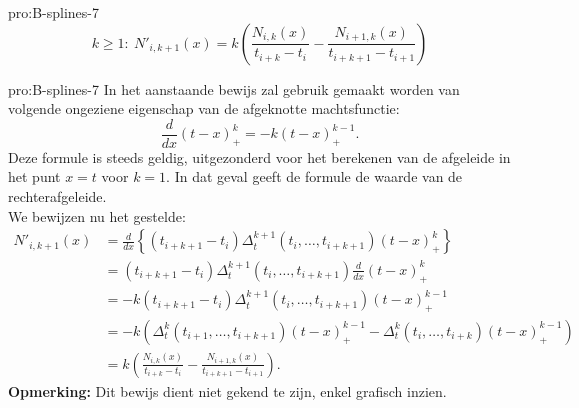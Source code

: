 \begin{pro}[B-spline]{pro:B-splines-7}
    \begin{equation*}
        k \geq 1:\ N'_{i,k+1}(x) = k\left(
            \frac{N_{i,k}(x)}{t_{i+k}-t_i} 
                - \frac{N_{i+1,k}(x)}{t_{i+k+1}-t_{i+1}}
        \right)
    \end{equation*}
    \vspace{-0.2cm}
\end{pro}

\begin{prf}[B-spline]{pro:B-splines-7}
    In het aanstaande bewijs zal gebruik gemaakt worden van volgende ongeziene eigenschap van de afgeknotte machtsfunctie:
        \begin{equation*}
            \frac{d}{dx} (t-x)^k_+ = -k(t-x)^{k-1}_+.
        \end{equation*}
    Deze formule is steeds geldig, uitgezonderd voor het berekenen van de afgeleide in het punt $x=t$ voor $k=1$. In dat geval geeft de formule de waarde van de rechterafgeleide. \\

    We bewijzen nu het gestelde:
    \begin{align*}
        N'_{i,k+1}(x) 
            &= \frac{d}{dx}\left\{
                    (t_{i+k+1}-t_i) \Delta_t^{k+1}(t_i,\ldots,t_{i+k+1}) (t-x)^k_+
                \right\} \\
            &= (t_{i+k+1}-t_i) \Delta_t^{k+1}(t_i,\ldots,t_{i+k+1}) \frac{d}{dx} (t-x)^k_+ \\
            &= -k(t_{i+k+1}-t_i) \Delta_t^{k+1}(t_i,\ldots,t_{i+k+1}) (t-x)^{k-1}_+ \\
            &= -k\left(
                \Delta_t^k(t_{i+1},\ldots,t_{i+k+1})(t-x)_+^{k-1}
                - \Delta_t^k(t_i,\ldots,t_{i+k})(t-x)_+^{k-1}
            \right) \\
            &= k\left(
                \frac{N_{i,k}(x)}{t_{i+k}-t_i} 
                - \frac{N_{i+1,k}(x)}{t_{i+k+1}-t_{i+1}}
            \right).
    \end{align*}
    \textbf{Opmerking:}  Dit bewijs dient niet gekend te zijn, enkel grafisch inzien.
\end{prf}

